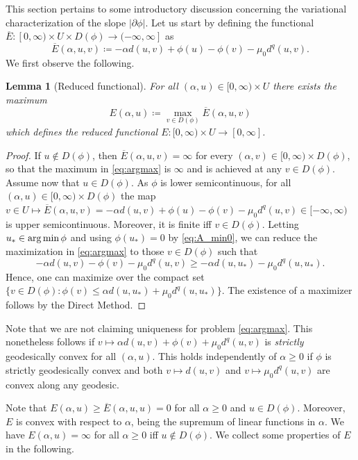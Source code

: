 \documentclass[10pt,a4paper]{amsart}
\newcommand{\ove}{\overline}
\DeclareMathOperator*{\argmin}{{\rm arg\,min}}
\renewcommand{\sl}{|\partial \phi|}
\newtheorem{lemma}[theorem]{Lemma}
\begin{document}
This section pertains to some introductory discussion concerning
the variational characterization of the slope $\sl$.
Let us start by defining the functional $\ove E: [0,\infty) \times U \times
D(\phi) \to (-\infty,\infty]$ as
\begin{equation*}
    \ove E(\alpha,u,v) \coloneqq -\alpha d(u,v) + \phi(u) -\phi(v)- \mu_0
 d^q(u,v).
\end{equation*}
We  first  observe the following.
\begin{lemma}[Reduced functional]\label{lemma:v}
  For all $(\alpha,u)\in [0,\infty)\times U$  there exists the maximum   \begin{equation}
  E(\alpha,u) \coloneqq   \max_{ v\in D(\phi)}   \ove
 E(\alpha,u,v) \label{eq:argmax}
\end{equation}
 which  defines the reduced functional $E : [0,\infty)\times U
 \to [0,\infty]$. 
\end{lemma}
\begin{proof}   If $u \notin D(\phi)$, then $\ove E(\alpha, u, v)=\infty$ for every $(\alpha, v) \in [0,\infty) \times D(\phi)$, so that the  maximum  in \eqref{eq:argmax} is $\infty$ and  is  achieved at any $v \in D(\phi)$.  Assume now that   $u \in D(\phi)$.
  As $\phi$ is
  lower semicontinuous,  for all $(\alpha,u)   \in [0,\infty) \times D(\phi)  $  the map $ v \in U
  \mapsto  \ove E(\alpha,u,v) = -\alpha d(u, v)+\phi(u)
  -\phi( v)  - \mu_0 d^q(u, v) \in [-\infty,\infty)$ is upper
  semicontinuous. Moreover, it is 
  finite iff $  v \in D(\phi)$. Letting $u_*\in \argmin \phi$ and using $\phi(u_*)=0$ by \eqref{eq:A_min0}, we can reduce the
  maximization  in \eqref{eq:argmax}  to those $ v\in D(\phi)$ such that $$-\alpha d(u, v)
  -\phi( v) - \mu_0  d^q(u, v)\geq -\alpha d(u,u_*)
  - \mu_0  d^q(u,u_*).$$
 Hence, one can maximize 
    over
  the compact set $\{ v \in D(\phi):\phi( v) \leq \alpha
  d(u,u_*) +{ \mu_0  }d^q(u,u_*)  \}$. The existence of a maximizer  follows by the Direct Method.
\end{proof}

Note that we are not claiming uniqueness for problem
\eqref{eq:argmax}. This nonetheless follows if $v \mapsto \alpha
d(u,v)+\phi(v) +  \mu_0  d^q(u,v)$ is {\it strictly} geodesically
convex for all $(\alpha,u)$. This holds independently of $\alpha
\geq 0$ if $\phi$ is
strictly geodesically convex and both $v\mapsto d(u,v)$ and $v\mapsto
 \mu_0  d^q(u,v)$ are 
convex along any geodesic. 

  Note that $ E(\alpha,u) \geq \ove E(\alpha,u,u)=0$  for all $\alpha\geq 0$ and
  $u \in  D(\phi)$. Moreover, $ E$ is convex with respect to $\alpha$, being the supremum of linear
  functions in $\alpha$. We have $ E(\alpha,u)=\infty$ for all $\alpha\geq
  0$ iff $u \not \in D(\phi)$. We collect some properties of $ E$ in the following.
\end{document}
